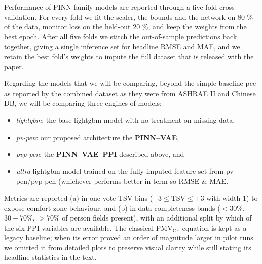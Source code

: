 Performance of PINN-family models are reported through a five-fold cross-validation.  For every fold we fit the scaler, the bounds and the network on 80 \% of the data, monitor loss on the held-out 20 \%, and keep the weights from the best epoch.  After all five folds we stitch the out-of-sample predictions back together, giving a single inference set for headline RMSE and MAE, and we retain the best fold’s weights to impute the full dataset that is released with the paper.

Regarding the models that we will be comparing, beyond the simple baseline \gls{pce} as reported by the combined dataset as they were from ASHRAE II and Chinese DB, we will be comparing three engines of models:

    \begin{itemize}
        \item \textit{lightgbm}: the base lightgbm model with no treatment on missing data,
        \item \textit{pv-pen}: our proposed architecture the \textbf{PINN--VAE},
        \item \textit{pvp-pen}: the \textbf{PINN--VAE--PPI} described above, and 
        \item \textit{ultra} lightgbm model trained on the fully imputed feature set from pv-pen/pvp-pen (whichever performs better in term so RMSE \& MAE.
    \end{itemize}

Metrics are reported (a) in one-vote TSV bins (\(-3\le\mathrm{TSV}\le+3\) with width 1) to expose
comfort-zone behaviour, and (b) in data-completeness bands (\(<30\%\), \(30\!-\!70\%\), \(>70\%\) of person fields present), with an additional split by which of the six PPI variables are available.  The classical PMV\(_{\text{CE}}\) equation is kept as a legacy baseline; when its error proved an order of magnitude larger in pilot runs we omitted it from detailed plots to preserve visual clarity while still stating its headline statistics in the text.

